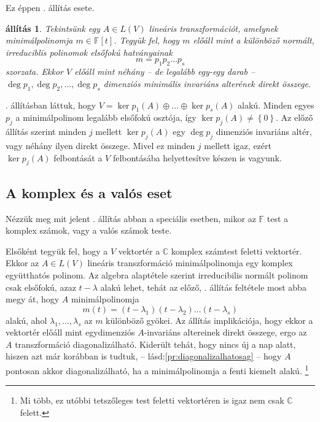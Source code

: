 \documentclass[a4paper, showtrims]{memoir}
\makeatletter
\renewenvironment{proof}[1][\proofname]
    {\par\pushQED{\qed}%
    \normalfont \topsep6\p@\@plus6\p@\relax
    \trivlist
    \item[\hskip\labelsep
        \itshape
    #1\@addpunct{:}]\ignorespaces}
    {\popQED\endtrivlist\@endpefalse}
\theoremstyle{plain}
\newtheorem{proposition}{állítás}[chapter]
\theoremstyle{remark}
\theoremstyle{definition}
\makeatother
\begin{document}
Ez éppen . állítás esete.
\begin{proposition}\label{pr:minpolelsofokufelbontas}
	Tekintsünk egy $A\in L\left( V \right)$ lineáris transzformációt,
	amelynek minimálpolinomja $m\in\mathbb{F}\left[ t \right]$.
	Tegyük fel,
	hogy $m$ előáll mint a különböző normált, irreduciblis polinomok elsőfokú hatványainak
	\[
		m=p_1p_2\dots p_s
	\]
	szorzata.
	Ekkor $V$ előáll mint néhány -- de legalább egy-egy darab --
	$\deg p_1,\deg p_2,\ldots,\deg p_s$ dimenziós minimális invariáns alterének direkt összege.
\end{proposition}
\begin{proof}
    . állításban láttuk,
	hogy $V=\ker p_1\left( A \right)\oplus\dots\oplus\ker p_s\left( A \right)$ alakú.
	Minden egyes $p_j$ a minimálpolinom legalább elsőfokú osztója, így $\ker p_j\left( A \right)\neq\left\{ 0 \right\}$.
	Az előző állítás szerint minden $j$ mellett $\ker p_j\left( A \right)$ egy $\deg p_j$
	dimenziós invariáns altér, vagy néhány ilyen direkt összege.
	Mivel ez minden $j$ mellett igaz, ezért $\ker p_j\left( A \right)$ felbontását a $V$ felbontásába helyettesítve készen is vagyunk.
\end{proof}
\subsection{A komplex és a valós eset}
Nézzük meg mit jelent . állítás abban a speciális esetben,
mikor az $\mathbb{F}$ test a komplex számok, vagy a valós számok teste.

Elsőként tegyük fel, hogy a $V$ vektortér a $\mathbb{C}$ komplex számtest feletti vektortér.
Ekkor az $A\in L\left( V \right)$ lineáris transzformáció minimálpolinomja egy komplex együtthatós polinom.
Az algebra alaptétele szerint irreducibilis normált polinom csak elsőfokú, azaz $t-\lambda$ alakú lehet,
tehát az előző, . állítás feltétele most abba megy át, hogy $A$ minimálpolinomja
\[
	m\left( t \right)=\left( t-\lambda_1 \right)\left( t-\lambda_2 \right)\dots\left( t-\lambda_s \right)
\]
alakú, ahol $\lambda_1,\ldots,\lambda_s$ az $m$ különböző gyökei.
Az állítás implikációja, hogy ekkor a vektortér előáll mint egydimenziós $A$-invariáns
altereinek direkt összege, ergo az $A$ transzformáció diagonalizálható.
Kiderült tehát, hogy nincs új a nap alatt, hiszen azt már korábban is tudtuk, -- lásd:\ref{pr:diagonalizalhatosag} -- hogy $A$ pontosan akkor diagonalizálható, ha a minimálpolinomja a fenti kiemelt alakú.%
\footnote{
    Mi több, ez utóbbi tetszőleges test feletti vektortéren is igaz nem csak $\mathbb{C}$ felett.
}
\end{document}

